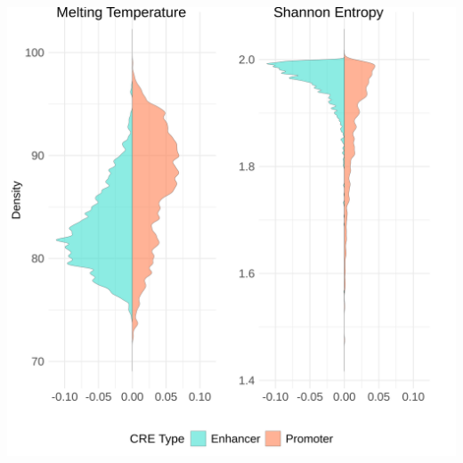 \documentclass[
  letterpaper,
]{article}
\begin{document}
\begin{center}
\includegraphics{gb-test-pdf_files/figure-pdf/subset-temp-shan-3-1.png}
\end{center}
\end{document}
